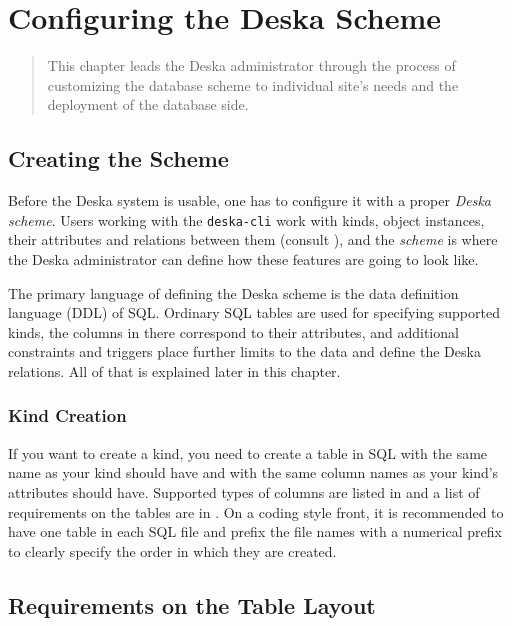 \documentclass[deska]{subfiles}
\begin{document}
\chapter{Configuring the Deska Scheme}
\label{sec:admin-dbscheme}

\begin{abstract}
This chapter leads the Deska administrator through the process of customizing the database scheme to individual site's
needs and the deployment of the database side.
\end{abstract}

\section{Creating the Scheme}

Before the Deska system is usable, one has to configure it with a proper {\em Deska scheme}.  Users working with the
{\tt deska-cli} work with kinds, object instances, their attributes and relations between them (consult
), and the {\em scheme} is where the Deska administrator can define how these features
are going to look like.

The primary language of defining the Deska scheme is the data definition language (DDL) of SQL.  Ordinary SQL tables are
used for specifying supported kinds, the columns in there correspond to their attributes, and additional constraints and
triggers place further limits to the data and define the Deska relations.  All of that is explained later in this
chapter.

\subsection{Kind Creation}
If you want to create a kind, you need to create a table in SQL with the same name as your kind should have and with the
same column names as your kind's attributes should have.  Supported types of columns are listed in
 and a list of requirements on the tables are in .  On a coding style
front,  it is recommended to have one table in each SQL file and prefix the file names with a numerical prefix to
clearly specify the order in which they are created.

\section{Requirements on the Table Layout}
\label{sec:db-scheme-req}
\end{document}
